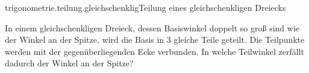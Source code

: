 \begin{exercise}{trigonometrie.teilung.gleichschenklig}{Teilung eines gleichschenkligen Dreiecks}
  \ifproblem\problem\par
    In einem gleichschenkligen Dreieck, dessen Basiswinkel
    doppelt so groß sind wie der Winkel an der Spitze, wird
    die Basis in 3 gleiche Teile geteilt. Die Teilpunkte
    werden mit der gegenüberliegenden Ecke verbunden. In
    welche Teilwinkel zerfällt dadurch der Winkel an der
    Spitze?
  \fi
\end{exercise}
